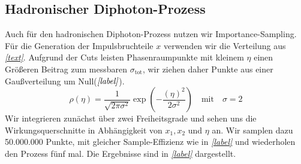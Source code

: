\subsection{Hadronischer Diphoton-Prozess}
 Auch für den hadronischen Diphoton-Prozess nutzen wir Importance-Sampling. Für die Generation der Impulsbruchteile $x$ verwenden wir die Verteilung aus \textit{\autoref{text}}. Aufgrund der Cuts leisten Phasenraumpunkte mit kleinem $\eta$ einen Größeren Beitrag zum messbaren $\sigma_{\text{tot}}$, wir ziehen daher Punkte aus einer Gaußverteilung um Null($\textit{\autoref{label}}$).
 \begin{equation}
 		\rho(\eta) = \frac{1}{\sqrt{2\pi \sigma^2}} \exp(-\frac{(\eta)^2}{2\sigma^2}) \quad \text{mit} \quad \sigma=2
 \end{equation}
 Wir integrieren zunächst über zwei Freiheitsgrade und sehen uns die Wirkungsquerschnitte in Abhängigkeit von $x_1, x_2$ und $\eta$ an. Wir samplen dazu 50.000.000 Punkte, mit gleicher Sample-Effizienz wie in \textit{\autoref{label}} und wiederholen den Prozess fünf mal. Die Ergebnisse sind in \textit{\autoref{label}} dargestellt.

